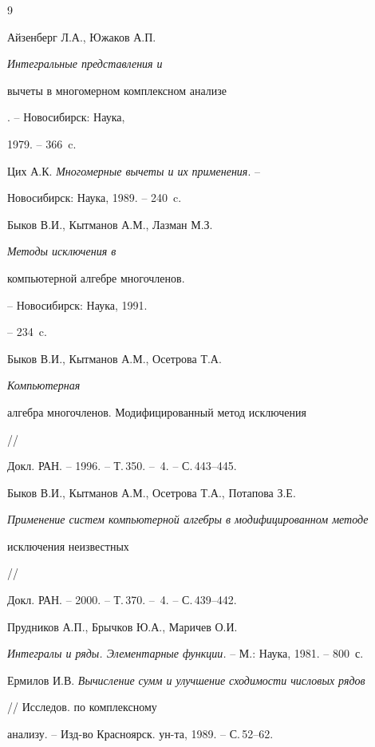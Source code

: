 \begin{thebibliography}{9}







Айзенберг Л.А., Южаков А.П. {\it Интегральные представления и


вычеты в многомерном комплексном анализе}. -- Новосибирск: Наука,


1979. -- 366~c.




Цих А.К. {\it Многомерные вычеты и их применения}. --


Новосибирск: Наука, 1989. -- 240~c.




Быков В.И., Кытманов  А.М., Лазман М.З. {\it Методы исключения  в 


компьютерной алгебре многочленов.} -- Новосибирск: Наука, 1991.


-- 234~c.




Быков В.И., Кытманов  А.М., Осетрова Т.А. {\it Компьютерная


алгебра многочленов. Модифицированный метод исключения} //


Докл. РАН. -- 1996. -- Т.\,350. -- \No\,4. -- С.\,443--445.




Быков В.И., Кытманов  А.М., Осетрова Т.А., Потапова З.Е.


{\it Применение систем компьютерной алгебры в модифицированном методе 


исключения неизвестных} //


Докл. РАН. -- 2000. -- Т.\,370. -- \No\,4. -- С.\,439--442.




Прудников А.П., Брычков Ю.А., Маричев О.И.


{\it Интегралы и ряды. Элементарные функции.} -- М.: Наука, 1981. -- 800~с.




Ермилов И.В. {\it Вычисление сумм и улучшение сходимости числовых рядов}


// Исследов. по комплексному


анализу. -- Изд-во Красноярск. ун-та, 1989. -- С.\,52--62.





\end{thebibliography}





\vskip 2cm












\label{end}





